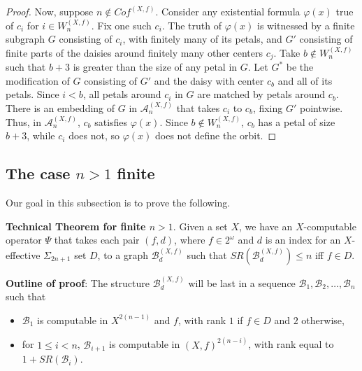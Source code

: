 \documentclass{article}
\begin{document}
\begin{proof}
Now, suppose $n\notin Cof^{(X,f)}$.  Consider any existential formula $\varphi(x)$ true of $c_i$ for $i\in W_n^{(X,f)}$.  Fix one such $c_i$.  The truth of $\varphi(x)$ is witnessed by a finite subgraph $G$ consisting of $c_i$, with finitely many of its petals, and $G'$ consisting of finite parts of the daisies around finitely many other centers $c_j$.  Take $b\notin W_n^{(X,f)}$ such that $b+3$ is greater than the size of any petal in $G$.  Let $G^*$ be the modification of $G$ consisting of $G'$ and the daisy with center $c_b$ and all of its petals.  Since $i < b$, all petals around $c_i$ in $G$ are matched by petals around $c_b$.  There is an embedding of $G$ in $\mathcal{A}^{(X,f)}_n$ that takes $c_i$ to $c_b$, fixing $G'$ pointwise.  Thus, in $\mathcal{A}^{(X,f)}_n$, $c_b$ satisfies $\varphi(x)$.  Since $b\notin W_n^{(X,f)}$, $c_b$ has a petal of size $b+3$, while $c_i$ does not, so $\varphi(x)$ does not define the orbit.  
\end{proof}



\subsection{The case $n > 1$ finite}

Our goal in this subsection is to prove the following.

\bigskip
\noindent
\textbf{Technical Theorem for finite $n > 1$}.  
Given a set $X$, we have an $X$-computable operator $\Psi$ that takes each pair $(f,d)$, where $f\in 2^\omega$ and $d$ is an index for an $X$-effective $\Sigma_{2n+1}$ set $D$, to a graph $\mathcal{B}^{(X,f)}_d$ such that $SR(\mathcal{B}^{(X,f)}_d)\leq n$ iff $f\in D$.   

\bigskip
\noindent
\textbf{Outline of proof}:  The structure $\mathcal{B}^{(X,f)}_d$ will be last in a sequence  
$\mathcal{B}_1,\mathcal{B}_2,\ldots,\mathcal{B}_n$ such that

\begin{itemize}

\item [(a)]  $\mathcal{B}_1$ is computable in $X^{2(n-1)}$ and $f$, with rank $1$ if $f\in D$ and $2$ otherwise,  

\item [(b)]  for $1\leq i < n$, $\mathcal{B}_{i+1}$ is computable in $(X,f)^{2(n-i)}$, with rank equal to $1+SR(\mathcal{B}_i)$.

\end{itemize}
\end{document}
